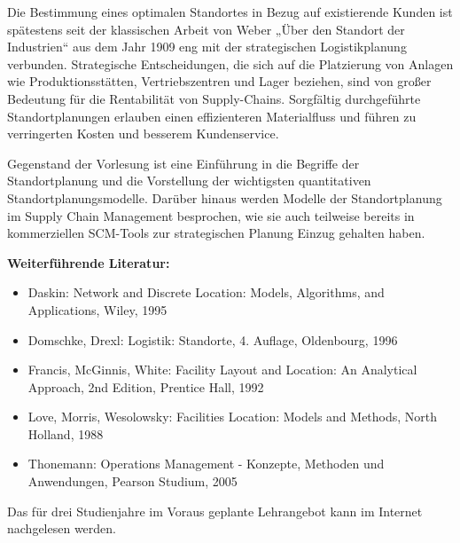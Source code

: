 \begin{course}
\begin{learningoutcomes}
\end{learningoutcomes}

\begin{content}
Die Bestimmung eines optimalen Standortes in Bezug auf existierende Kunden ist spätestens seit der klassischen Arbeit von Weber „Über den Standort der Industrien“ aus dem Jahr 1909 eng mit der strategischen Logistikplanung verbunden. Strategische Entscheidungen, die sich auf die Platzierung von Anlagen wie Produktionsstätten, Vertriebszentren und Lager beziehen, sind von großer Bedeutung für die Rentabilität von Supply-Chains. Sorgfältig durchgeführte Standortplanungen erlauben einen effizienteren Materialfluss und führen zu verringerten Kosten und besserem Kundenservice.

 

Gegenstand der Vorlesung ist eine Einführung in die Begriffe der Standortplanung und die Vorstellung der wichtigsten quantitativen Standortplanungsmodelle. Darüber hinaus werden Modelle der Standortplanung im Supply Chain Management besprochen, wie sie auch teilweise bereits in kommerziellen SCM-Tools zur strategischen Planung Einzug gehalten haben.


\end{content}



\begin{literature}\textbf{Weiterführende Literatur:}

 \begin{itemize}\item Daskin: Network and Discrete Location: Models, Algorithms, and Applications, Wiley, 1995  \item Domschke, Drexl: Logistik: Standorte, 4. Auflage, Oldenbourg, 1996  \item Francis, McGinnis, White: Facility Layout and Location: An Analytical Approach, 2nd Edition, Prentice Hall, 1992  \item Love, Morris, Wesolowsky: Facilities Location: Models and Methods, North Holland, 1988  \item Thonemann: Operations Management - Konzepte, Methoden und Anwendungen, Pearson Studium, 2005  \end{itemize}\end{literature}

\begin{remarks}Das für drei Studienjahre im Voraus geplante Lehrangebot kann im Internet nachgelesen werden.

\end{remarks}

\end{course}